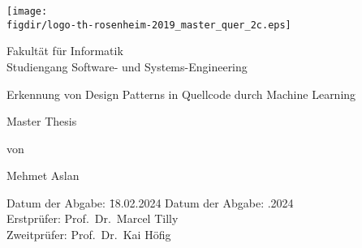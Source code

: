 \begin{titlepage}

\sffamily

\raggedleft

\vspace*{-2cm}

\texttt{[image: \\figdir/logo-th-rosenheim-2019\_master\_quer\_2c.eps]}

\vfill

\centering
\LARGE
Fakultät für Informatik  \vspace{0.5cm}\\
\Large
Studiengang Software- und Systems-Engineering

\vspace{2cm}

\LARGE

Erkennung von Design Patterns in Quellcode durch Machine Learning

\vspace{2cm}

\Large
Master Thesis

\vspace{1.5cm}


\Large
von

\vspace{0.5cm}


\LARGE
Mehmet Aslan \vspace{1cm}

\vspace{1cm}

\flushleft
 \Large
\vspace*{\fill}

\begin{tabbing}
Datum der Abgabe: \= 18.02.2024 \kill
Datum der Abgabe: .2024 \\
Erstprüfer: \> Prof.\ Dr.\ Marcel Tilly\\
Zweitprüfer: \> Prof.\ Dr.\ Kai Höfig
\end{tabbing}

\end{titlepage}

\cleardoubleemptypage

